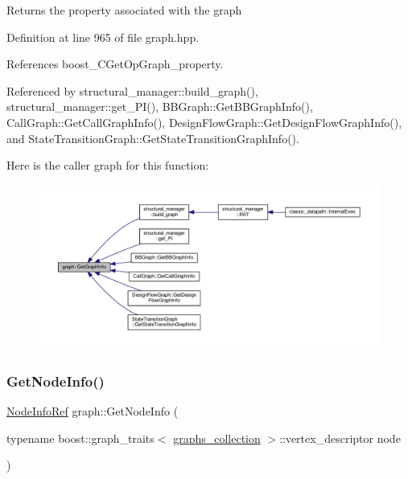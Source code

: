 \begin{DoxyReturn}{Returns}
the property associated with the graph 
\end{DoxyReturn}


Definition at line 965 of file graph.\+hpp.



References boost\+\_\+\+C\+Get\+Op\+Graph\+\_\+property.



Referenced by structural\+\_\+manager\+::build\+\_\+graph(), structural\+\_\+manager\+::get\+\_\+\+P\+I(), B\+B\+Graph\+::\+Get\+B\+B\+Graph\+Info(), Call\+Graph\+::\+Get\+Call\+Graph\+Info(), Design\+Flow\+Graph\+::\+Get\+Design\+Flow\+Graph\+Info(), and State\+Transition\+Graph\+::\+Get\+State\+Transition\+Graph\+Info().

Here is the caller graph for this function\+:
\nopagebreak
\begin{figure}[H]
\begin{center}
\leavevmode
\includegraphics[width=350pt]{d5/d15/structgraph_a09feef618b21029c29d8635a7dedecdf_icgraph}
\end{center}
\end{figure}
\mbox{\label{structgraph_a5c0638bd03bcc6491a7751354af7ea7e}} 
\subsubsection{\texorpdfstring{Get\+Node\+Info()}{GetNodeInfo()}}
{\footnotesize\ttfamily \hyperlink{node__info_8hpp_a345f052eed4efe04f7848fd0ebd015b2}{Node\+Info\+Ref} graph\+::\+Get\+Node\+Info (\begin{DoxyParamCaption}\item[{typename boost\+::graph\+\_\+traits$<$ \hyperlink{structgraphs__collection}{graphs\+\_\+collection} $>$\+::vertex\+\_\+descriptor}]{node }\end{DoxyParamCaption})\hspace{0.3cm}{\ttfamily [inline]}}



